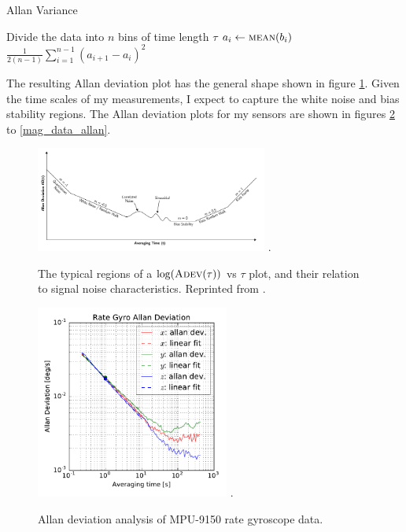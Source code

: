 \documentclass[conference]{IEEEtran}
\begin{document}
\begin{algorithm}
  \caption{Allan Variance}
  \label{avar}
  \begin{algorithmic}
      \State Divide the data into $n$ bins of time length $\tau$
        \State $a_i \gets \Call{mean}{b_i}$
      \EndFor
      \State \Return $\frac{1}{2 (n-1)} \sum_{i=1}^{n-1} (a_{i+1} - a_{i})^2$
      \EndFunction
  \end{algorithmic}
\end{algorithm}

The resulting Allan deviation plot has the general shape shown in figure \ref{allan_regions}. Given the time scales of my measurements, I expect to capture the white noise and bias stability regions. The Allan deviation plots for my sensors are shown in figures \ref{gyro_data_allan} to \ref{mag_data_allan}. \\

\begin{figure}[!t]
  \centering
  \includegraphics[width=3in]{figures/allan_regions.png}
  \DeclareGraphicsExtensions.
  \caption{The typical regions of a $\log(\textproc{Adev}(\tau))$ vs $\tau$ plot, and their relation to signal noise characteristics. Reprinted from \cite{UCAM-CL-TR-696}.}
  \label{allan_regions}
\end{figure}

\begin{figure}[!t]
  \centering
  \includegraphics[width=2.5in]{figures/gyro_data_allan.pdf}
  \DeclareGraphicsExtensions.
  \caption{Allan deviation analysis of MPU-9150 rate gyroscope data.}
  \label{gyro_data_allan}
\end{figure}
\end{document}
